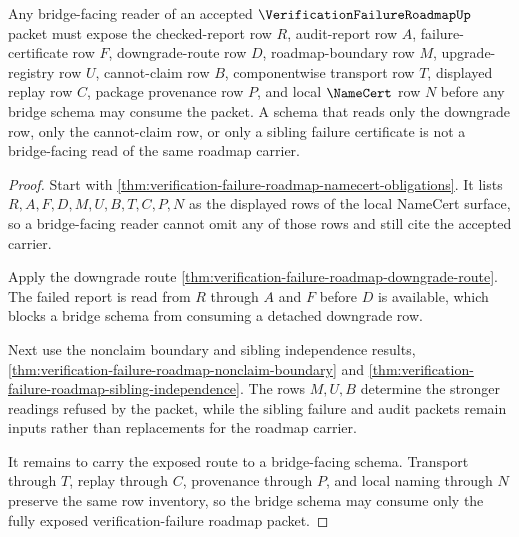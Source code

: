 \begin{theorem}
\label{thm:verification-failure-roadmap-bridge-facing-schema-route}
Any bridge-facing reader of an accepted $\VerificationFailureRoadmapUp$ packet must expose the checked-report row $R$, audit-report row $A$, failure-certificate row $F$, downgrade-route row $D$, roadmap-boundary row $M$, upgrade-registry row $U$, cannot-claim row $B$, componentwise transport row $T$, displayed replay row $C$, package provenance row $P$, and local $\NameCert$ row $N$ before any bridge schema may consume the packet. A schema that reads only the downgrade row, only the cannot-claim row, or only a sibling failure certificate is not a bridge-facing read of the same roadmap carrier.
\end{theorem}
\begin{proof}
Start with \autoref{thm:verification-failure-roadmap-namecert-obligations}. It lists $R,A,F,D,M,U,B,T,C,P,N$ as the displayed rows of the local NameCert surface, so a bridge-facing reader cannot omit any of those rows and still cite the accepted carrier.

Apply the downgrade route \autoref{thm:verification-failure-roadmap-downgrade-route}. The failed report is read from $R$ through $A$ and $F$ before $D$ is available, which blocks a bridge schema from consuming a detached downgrade row.

Next use the nonclaim boundary and sibling independence results, \autoref{thm:verification-failure-roadmap-nonclaim-boundary} and \autoref{thm:verification-failure-roadmap-sibling-independence}. The rows $M,U,B$ determine the stronger readings refused by the packet, while the sibling failure and audit packets remain inputs rather than replacements for the roadmap carrier.

It remains to carry the exposed route to a bridge-facing schema. Transport through $T$, replay through $C$, provenance through $P$, and local naming through $N$ preserve the same row inventory, so the bridge schema may consume only the fully exposed verification-failure roadmap packet.
\end{proof}


